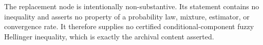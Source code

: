 The replacement node is intentionally non-substantive. Its statement contains no inequality and asserts no property of a probability law, mixture, estimator, or convergence rate. It therefore supplies no certified conditional-component fuzzy Hellinger inequality, which is exactly the archival content asserted.